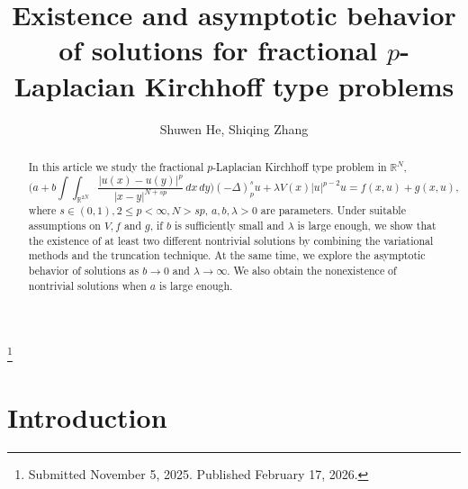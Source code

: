 \documentclass[reqno]{amsart}
\begin{document}
\title[\hfilneg EJDE-2026/15\hfil Fractional $p$-Laplacian Kirchhoff type problems]
{Existence and asymptotic behavior of solutions for fractional $p$-Laplacian
Kirchhoff type problems}


\author[S. He, S. Zhang \hfil EJDE-2026/15\hfilneg]
{Shuwen He, Shiqing Zhang}

\address{Shuwen He (corresponding author) \newline
School of Mathematics,
Sichuan University,
Chengdu 610064, China}

\address{Shiqing Zhang \newline
School of Mathematics,
Sichuan University,
Chengdu 610064, China}

\thanks{Submitted November 5, 2025. Published February 17, 2026.}

\begin{abstract}
In this article we study the fractional $p$-Laplacian Kirchhoff type problem in
$\mathbb{R}^N$,
\[
\Big(a+b\int\int_{\mathbb{R}^{2N}}\frac{|u(x)-u(y)|^p}{|x-y|^{N+sp}}\,dx\,dy\Big)
(-\Delta)_p^s u+\lambda V(x)|u|^{p-2}u=f(x,u)+g(x,u),
\]
where $s\in(0,1), 2\leq p<\infty, N>sp$, $a, b, \lambda>0$ are parameters.
Under suitable assumptions on $V, f$ and $g$, if $b$ is sufficiently small and
$\lambda$ is large enough, we show that the existence of at least two different
nontrivial solutions by combining the variational methods and the truncation
technique. At the same time, we explore the asymptotic behavior of solutions as
$b\to 0$ and $\lambda\to \infty$. We also obtain the nonexistence of nontrivial
solutions when $a$ is large enough.
\end{abstract}

\maketitle
{}
\newtheorem{theorem}{Theorem}[section]
\newtheorem{lemma}[theorem]{Lemma}
\newtheorem{remark}[theorem]{Remark}
\allowdisplaybreaks

\section{Introduction}
\end{document}
